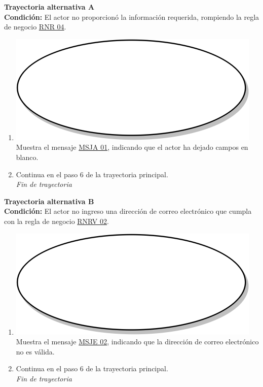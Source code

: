 \textbf{Trayectoria alternativa A} \label{cu1_1_ta_a} \\
\textbf{Condición:} El actor no proporcionó la información requerida, rompiendo la regla de negocio \hyperref[rnr_04]{RNR 04}.\\
 \begin{enumerate}[label=A\arabic*]
    \item {\includegraphics[scale=.05]{Capitulo3/img/proceso.png} Muestra el mensaje \hyperref[msja_01]{MSJA 01}, indicando que el actor ha dejado campos en blanco.}
    \item {Continua en el paso 6  de la trayectoria principal.} \\
    \textit{Fin de trayectoria} \\
\end{enumerate}

\textbf{Trayectoria alternativa B} \label{cu1_1_ta_b}\\
\textbf{Condición:} El actor no ingreso una dirección de correo electrónico que cumpla con la regla de negocio \hyperref[rnrv_02]{RNRV 02}.\\
 \begin{enumerate}[label=B\arabic*]
    \item {\includegraphics[scale=.05]{Capitulo3/img/proceso.png} Muestra el mensaje \hyperref[msje_02]{MSJE 02}, indicando que la dirección de correo electrónico no es válida.}
    \item {Continua en el paso 6 de la trayectoria principal.} \\
    \textit{Fin de trayectoria} \\
\end{enumerate}

